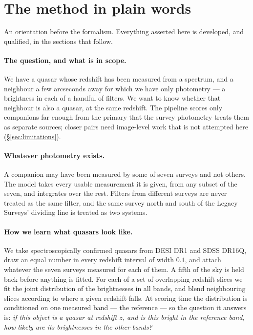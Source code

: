 \documentclass[11pt,a4paper]{article}
\begin{document}
\section*{The method in plain words}

An orientation before the formalism. Everything asserted here is developed, and
qualified, in the sections that follow.

\paragraph{The question, and what is in scope.} We have a quasar whose redshift
has been measured from a spectrum, and a neighbour a few arcseconds away for
which we have only photometry --- a brightness in each of a handful of filters.
We want to know whether that neighbour is also a quasar, at the same redshift.
The pipeline scores only companions far enough from the primary that the survey
photometry treats them as separate sources; closer pairs need image-level work
that is not attempted here (\S\ref{sec:limitations}).

\paragraph{Whatever photometry exists.} A companion may have been measured by
some of seven surveys and not others. The model takes every usable measurement
it is given, from any subset of the seven, and integrates over the rest. Filters
from different surveys are never treated as the same filter, and the same survey
north and south of the Legacy Surveys' dividing line is treated as two systems.

\paragraph{How we learn what quasars look like.} We take spectroscopically
confirmed quasars from DESI DR1 and SDSS DR16Q, draw an equal number in every
redshift interval of width $0.1$, and attach whatever the seven surveys measured
for each of them. A fifth of the sky is held back before anything is fitted.
For each of a set of overlapping redshift slices we fit the joint distribution
of the brightnesses in all bands, and blend neighbouring slices according to
where a given redshift falls. At scoring time the distribution is conditioned
on one measured band --- the reference --- so the question it answers is:
\emph{if this object is a quasar at redshift $z$, and is this bright in the
reference band, how likely are its brightnesses in the other bands?}
\end{document}
